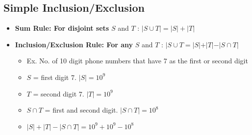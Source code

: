 \documentclass{article}\usepackage{amsmath,amssymb,amsthm,tikz,tkz-graph,color,chngpage,soul,hyperref,csquotes,graphicx,floatrow, listings}\newcommand*{\QEDB}{\hfill\ensuremath{\square}}\newtheorem*{prop}{Proposition}\renewcommand{\theenumi}{\alph{enumi}}\usepackage[shortlabels]{enumitem}\usepackage[nobreak=true]{mdframed}\usetikzlibrary{matrix,calc}\MakeOuterQuote{"}\usepackage[margin=0.75in]{geometry} \newtheorem{theorem}{Theorem}\newcommand{\Z}{\mathbb Z}\newcommand{\R}{\mathbb R}\newcommand{\Q}{\mathbb Q}\newcommand{\N}{\mathbb N}\newcommand{\x}[1]{\textrm{#1}}
\begin{document}
\subsection*{Simple Inclusion/Exclusion}
\begin{mdframed}
\begin{itemize}
    \item \textbf{Sum Rule: For disjoint sets} $S$ and $T$ : $|S\cup T|=|S|+|T|$
    \item \textbf{Inclusion/Exclusion Rule: For any} $S$ and $T$ : $|S\cup T=|S|+|T|-|S\cap T|$
    \begin{itemize}
        \item Ex. No. of 10 digit phone numbers that have 7 as the first or second digit
        \item $S$ = first digit 7. $|S|=10^9$
        \item $T$ = second digit 7. $|T|=10^9$
        \item $S\cap T$ = first and second digit. $|S\cap T|=10^8$
        \item $|S|+|T|-|S\cap T|=10^9+10^9-10^8$
    \end{itemize}
\end{itemize}
\end{mdframed}
\hrulefill
\end{document}
